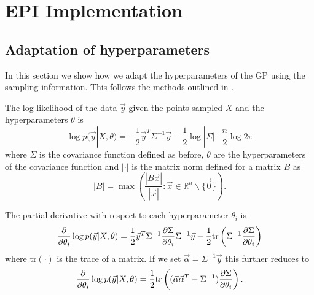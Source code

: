 
\section{EPI Implementation} %
\label{cha:EPI Implementation}

\subsection{Adaptation of hyperparameters} %
\label{sec:Adaptation of hyperparameters}

In this section we show how we adapt the hyperparameters of the GP using the sampling information. This follows the methods outlined in \cite{RW}.

The log-likelihood of the data $\vec{y}$ given the points sampled $X$ and the hyperparameters $\theta$ is
\begin{equation}
    \log p(\vec{y}|X, \theta) = -\frac{1}{2}\vec{y}^{T}\Sigma^{-1}\vec{y} - \frac{1}{2}\log|\Sigma| - \frac{n}{2} \log 2\pi
\end{equation}
where $\Sigma$ is the covariance function defined as before, $\theta$ are the hyperparameters of the covariance function and $|\cdot|$ is the matrix norm defined for a matrix $B$ as
\begin{equation}
    |B| = \max \left( \frac{|B\vec{x}|}{|\vec{x}|} : \vec{x} \in \mathbb{R}^{n}\backslash\{\vec{0}\} \right).
\end{equation}

The partial derivative with respect to each hyperparameter $\theta_{i}$ is
\begin{equation}
    \frac{\partial}{\partial \theta_{i}} \log p(\vec{y}|X,\theta) = \frac{1}{2}\vec{y}^{T}\Sigma^{-1}\frac{\partial \Sigma}{\partial \theta_{i}} \Sigma^{-1}\vec{y} - \frac{1}{2} {\rm tr}\left( \Sigma^{-1}\frac{\partial \Sigma}{\partial \theta_{i}} \right)
\end{equation}
where tr$(\cdot)$ is the trace of a matrix. If we set $\vec{\alpha} = \Sigma^{-1}\vec{y}$ this further reduces to
\begin{equation}
    \frac{\partial}{\partial \theta_{i}} \log p(\vec{y}|X,\theta) = \frac{1}{2} {\rm tr}\left((\vec{\alpha}\vec{\alpha}^{T} - \Sigma^{-1})\frac{\partial \Sigma}{\partial \theta_{i}}\right).
\end{equation}

